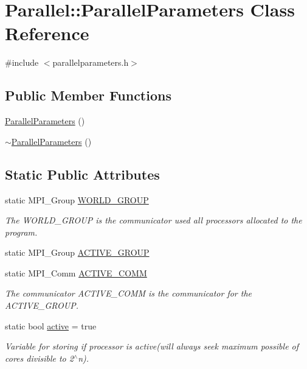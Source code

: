 \hypertarget{class_parallel_1_1_parallel_parameters}{}\section{Parallel\+::Parallel\+Parameters Class Reference}
\label{class_parallel_1_1_parallel_parameters}


{\ttfamily \#include $<$parallelparameters.\+h$>$}

\subsection*{Public Member Functions}
\begin{DoxyCompactItemize}
\item 
\mbox{\hyperlink{class_parallel_1_1_parallel_parameters_a422ffedb9f1c4dd89e98cfcae17e954a}{Parallel\+Parameters}} ()
\item 
\mbox{\hyperlink{class_parallel_1_1_parallel_parameters_aa073ba178c040d74103c0f9e7419243a}{$\sim$\+Parallel\+Parameters}} ()
\end{DoxyCompactItemize}
\subsection*{Static Public Attributes}
\begin{DoxyCompactItemize}
\item 
static M\+P\+I\+\_\+\+Group \mbox{\hyperlink{class_parallel_1_1_parallel_parameters_a2297be86fcb257862669b9b40ff74194}{W\+O\+R\+L\+D\+\_\+\+G\+R\+O\+UP}}
\begin{DoxyCompactList}\small\item\em The W\+O\+R\+L\+D\+\_\+\+G\+R\+O\+UP is the communicator used all processors allocated to the program. \end{DoxyCompactList}\item 
static M\+P\+I\+\_\+\+Group \mbox{\hyperlink{class_parallel_1_1_parallel_parameters_a670452a0f160992cca5c21453cfca71c}{A\+C\+T\+I\+V\+E\+\_\+\+G\+R\+O\+UP}}
\item 
static M\+P\+I\+\_\+\+Comm \mbox{\hyperlink{class_parallel_1_1_parallel_parameters_aef6da63b4d0247e6e249e64f2ed38ef4}{A\+C\+T\+I\+V\+E\+\_\+\+C\+O\+MM}}
\begin{DoxyCompactList}\small\item\em The communicator A\+C\+T\+I\+V\+E\+\_\+\+C\+O\+MM is the communicator for the A\+C\+T\+I\+V\+E\+\_\+\+G\+R\+O\+UP. \end{DoxyCompactList}\item 
static bool \mbox{\hyperlink{class_parallel_1_1_parallel_parameters_ace12f9f1ec880a8c8dcfc1169c1db3f2}{active}} = true
\begin{DoxyCompactList}\small\item\em Variable for storing if processor is active(will always seek maximum possible of cores divisible to 2$^\wedge$n). \end{DoxyCompactList}\end{DoxyCompactItemize}


